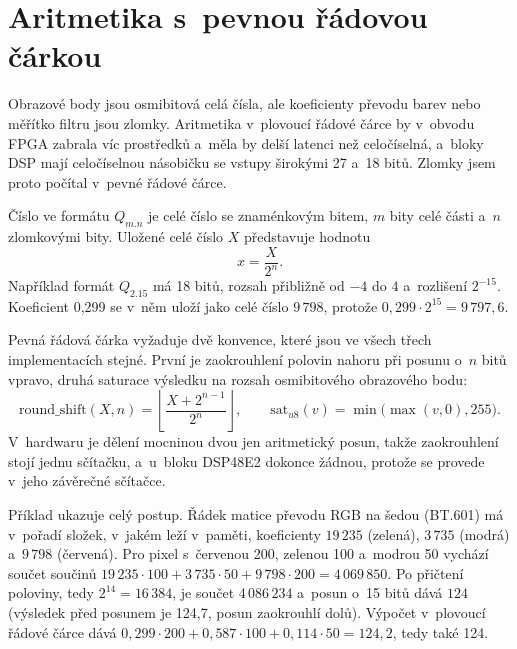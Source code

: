 \documentclass[FM,DP]{tulthesis}
\begin{document}
\section{Aritmetika s~pevnou řádovou čárkou}
\label{sec:aritmetika}

Obrazové body jsou osmibitová celá čísla, ale koeficienty převodu barev nebo
měřítko filtru jsou zlomky. Aritmetika v~plovoucí řádové čárce by v~obvodu
\ac{FPGA} zabrala víc prostředků a~měla by delší latenci než celočíselná,
a~bloky \ac{DSP} mají celočíselnou násobičku se vstupy širokými 27 a~18 bitů.
Zlomky jsem proto počítal v~pevné řádové čárce.

Číslo ve formátu $Q_{m.n}$ je celé číslo se znaménkovým bitem, $m$ bity celé části a~$n$ zlomkovými bity. Uložené celé číslo $X$ představuje hodnotu
\begin{equation}
    x = \frac{X}{2^{n}} .
    \label{eq:q-format}
\end{equation}
Například formát $Q_{2.15}$ má 18 bitů, rozsah přibližně od $-4$ do $4$ a~rozlišení $2^{-15}$. Koeficient 0,299 se v~něm uloží jako celé číslo $9\,798$, protože $0{,}299 \cdot 2^{15} = 9\,797{,}6$.

Pevná řádová čárka vyžaduje dvě konvence, které jsou ve všech třech
implementacích stejné. První je zaokrouhlení polovin nahoru při posunu o~$n$
bitů vpravo, druhá saturace výsledku na rozsah osmibitového obrazového bodu:
\begin{equation}
    \mathrm{round\_shift}(X, n) = \left\lfloor \frac{X + 2^{n-1}}{2^{n}} \right\rfloor ,
    \qquad
    \mathrm{sat}_{u8}(v) = \min\bigl(\max(v, 0), 255\bigr) .
    \label{eq:round-sat}
\end{equation}
V~hardwaru je dělení mocninou dvou jen aritmetický posun, takže zaokrouhlení stojí jednu sčítačku, a~u~bloku DSP48E2 dokonce žádnou, protože se provede v~jeho závěrečné sčítačce.

Příklad ukazuje celý postup. Řádek matice převodu RGB na šedou (BT.601) má
v~pořadí složek, v~jakém leží v~paměti, koeficienty $19\,235$ (zelená),
$3\,735$ (modrá) a~$9\,798$ (červená). Pro pixel s~červenou 200, zelenou 100
a~modrou 50 vychází součet součinů $19\,235 \cdot 100 + 3\,735 \cdot 50 +
    9\,798 \cdot 200 = 4\,069\,850$. Po přičtení poloviny, tedy $2^{14} = 16\,384$,
je součet $4\,086\,234$ a~posun o~15 bitů dává $124$ (výsledek před posunem je
124,7, posun zaokrouhlí dolů). Výpočet v~plovoucí řádové čárce dává $0{,}299
    \cdot 200 + 0{,}587 \cdot 100 + 0{,}114 \cdot 50 = 124{,}2$, tedy také 124.
\end{document}
